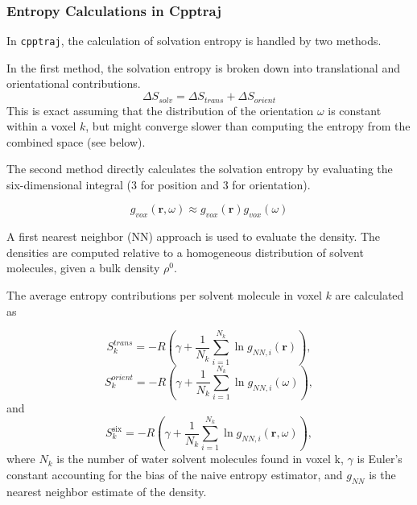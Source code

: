\documentclass[9pt,tutorial]{livecoms}
\newcommand{\software}{\texttt}
\begin{document}
\subsubsection{Entropy Calculations in Cpptraj}
In \software{cpptraj}, the calculation of solvation entropy is handled by two methods.

In the first method, the solvation entropy is broken down into translational and orientational contributions.
\begin{equation}
\Delta S_\textit{solv} = \Delta S_\textit{trans} + \Delta S_\textit{orient}
\end{equation}
This is exact assuming that the distribution of the orientation $\omega$ is constant within a voxel $k$, but might converge slower than computing the entropy from the combined space (see below).

The second method directly calculates the solvation entropy by evaluating the six-dimensional integral (3 for position and 3 for orientation).

\begin{equation}
g_\textit{vox} \left( \textbf{r}, \omega \right) \approx g_\textit{vox}(\textbf{r}) g_\textit{vox}(\omega)
\end{equation}

A first nearest neighbor (NN) approach is used to evaluate the density.
The densities are computed relative to a homogeneous distribution of solvent molecules, given a bulk density $\rho^0$.

The average entropy contributions per solvent molecule in voxel $k$ are calculated as

\begin{equation}
	S_{k}^\textit{trans} = -R \left( \gamma + \frac{1}{N_\textit{k}} \sum _{i=1}^{N_k} \ln g_{NN, \textit{i}}(\textbf{r}) \right),
\end{equation}
\begin{equation}
S_{k}^\textit{orient} = -R \left( \gamma + \frac{1}{N_k} \sum _{i=1}^{N_k} \ln g_{NN, i}(\omega) \right)
,
\end{equation}
and
\begin{equation}
S_\textit{k}^\text{six} = -R \left( \gamma + \frac{1}{N_\textit{k}} \sum _{i=1}^{N_k} \ln g_{NN, \textit{i}}(\textbf{r},\omega) \right),
\end{equation}
where $N_\textit{k}$ is the number of water solvent molecules found in voxel k, $\gamma$ is Euler's constant accounting for the bias of the naive entropy estimator, and $g_\textit{NN}$ is the nearest neighbor estimate of the density.
\end{document}
